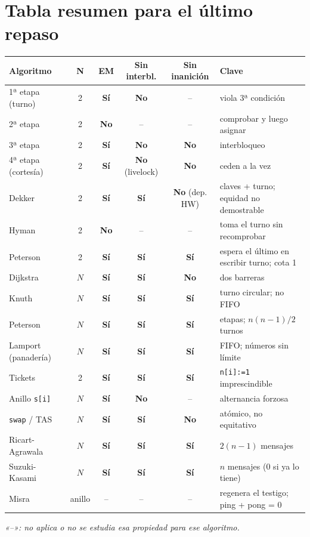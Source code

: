 \documentclass[11pt,a4paper,oneside]{report}
\newcommand{\si}{\textcolor{scdGreen}{\textbf{Sí}}}
\newcommand{\no}{\textcolor{scdRed}{\textbf{No}}}
\begin{document}
\clearpage
\section{Tabla resumen para el último repaso}
\begin{center}\small
\setlength{\tabcolsep}{4pt}
\begin{tabular}{lcccc p{4.2cm}}
\toprule
\textbf{Algoritmo} & \textbf{N} & \textbf{EM} & \textbf{Sin interbl.} & \textbf{Sin inanición} & \textbf{Clave} \\ \midrule
1ª etapa (turno) & 2 & \si & \no & -- & viola 3ª condición \\
2ª etapa & 2 & \no & -- & -- & comprobar y luego asignar \\
3ª etapa & 2 & \si & \no & \no & interbloqueo \\
4ª etapa (cortesía) & 2 & \si & \no{} (livelock) & \no & ceden a la vez \\
Dekker & 2 & \si & \si & \no{} (dep. HW) & claves + turno; equidad no demostrable \\
Hyman & 2 & \no & -- & -- & toma el turno sin recomprobar \\
Peterson & 2 & \si & \si & \si & espera el último en escribir turno; cota 1 \\
Dijkstra & $N$ & \si & \si & \no & dos barreras \\
Knuth & $N$ & \si & \si & \si & turno circular; no FIFO \\
Peterson & $N$ & \si & \si & \si & etapas; $n(n-1)/2$ turnos \\
Lamport (panadería) & $N$ & \si & \si & \si & FIFO; números sin límite \\
Tickets & 2 & \si & \si & \si & \texttt{n[i]:=1} imprescindible \\
Anillo \texttt{s[i]} & $N$ & \si & \no & -- & alternancia forzosa \\
\texttt{swap} / TAS & $N$ & \si & \si & \no & atómico, no equitativo \\
Ricart-Agrawala & $N$ & \si & \si & \si & $2(n-1)$ mensajes \\
Suzuki-Kasami & $N$ & \si & \si & \si & $n$ mensajes (0 si ya lo tiene) \\
Misra & anillo & -- & -- & -- & regenera el testigo; ping + pong = 0 \\
\bottomrule
\end{tabular}
\end{center}
\textit{«--»: no aplica o no se estudia esa propiedad para ese algoritmo.}
\end{document}
